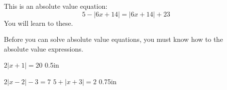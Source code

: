 This is an absolute value equation:
\begin{equation*}
    5 - |6x + 14| = |6x+14| + 23 
\end{equation*}
%
You will learn to  these.

\begin{tcolorbox}[center,width=4in,]
    Before you can solve absolute value equations,
    you must know how to  the absolute value expressions.
\end{tcolorbox}


{
    $2|x+1| = 20$
}{0.5in}

\myProblems
{
    $2|x-2| -3 = 7$
}
{
    $5 + |x+3| = 2$
}{0.75in}

